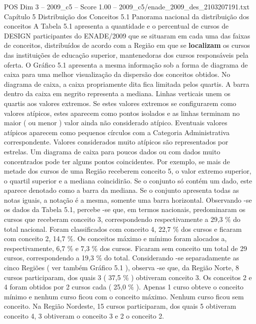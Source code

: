 \begin{textsample}{POS Dim 3 – 2009\_c5 – Score 1.00 – 2009\_c5/enade\_2009\_des\_2103207191.txt}  \label{ex:f3_pos_137}
Capítulo 5 Distribuição dos Conceitos 5.1 Panorama nacional da distribuição dos conceitos A Tabela 5.1 apresenta a quantidade e o percentual de cursos de DESIGN participantes do ENADE/2009 que se situaram em cada uma das faixas de conceitos, distribuídos de acordo com a Região em que se \textbf{localizam} os cursos das instituições de educação superior, mantenedoras dos cursos responsáveis pela oferta.
O Gráfico 5.1 apresenta a mesma informação sob a forma de diagrama de caixa para uma melhor visualização da dispersão dos conceitos obtidos.
No diagrama de caixa, a caixa propriamente dita fica limitada pelos quartis.
A barra dentro da caixa em negrito representa a mediana.
Linhas verticais unem os quartis aos valores extremos.
Se estes valores extremos se configurarem como valores atípicos, estes aparecem como pontos isolados e as linhas terminam no maior ( ou menor ) valor ainda não considerado atípico.
Eventuais valores atípicos aparecem como pequenos círculos com a Categoria Administrativa correspondente.
Valores considerados muito atípicos são representados por estrelas.
Um diagrama de caixa para poucos dados ou com dados muito concentrados pode ter alguns pontos coincidentes.
Por exemplo, se mais de metade dos cursos de uma Região receberem conceito 5, o valor extremo superior, o quartil superior e a mediana coincidirão.
Se o conjunto só contém um dado, este aparece denotado como a barra da mediana.
Se o conjunto apresenta todas as notas iguais, a notação é a mesma, somente uma barra horizontal.
Observando -se os dados da Tabela 5.1, percebe -se que, em termos nacionais, predominaram os cursos que receberam conceito 3, correspondendo respectivamente a 29,3 \% do total nacional.
Foram classificados com conceito 4, 22,7 \% dos cursos e ficaram com conceito 2, 14,7 \%.
Os conceitos máximo e mínimo foram alocados a, respectivamente, 6,7 \% e 7,3 \% dos cursos.
Ficaram sem conceito um total de 29 cursos, correspondendo a 19,3 \% do total.
Considerando -se separadamente as cinco Regiões ( ver também Gráfico 5.1 ), observa -se que, da Região Norte, 8 cursos participaram, dos quais 3 ( 37,5 \% ) obtiveram conceito 3.
Os conceitos 2 e 4 foram obtidos por 2 cursos cada ( 25,0 \% ).
Apenas 1 curso obteve o conceito mínimo e nenhum curso ficou com o conceito máximo.
Nenhum curso ficou sem conceito.
Na Região Nordeste, 15 cursos participaram, dos quais 5 obtiveram conceito 4, 3 obtiveram o conceito 3 e 2 o conceito 2.

\end{textsample}
